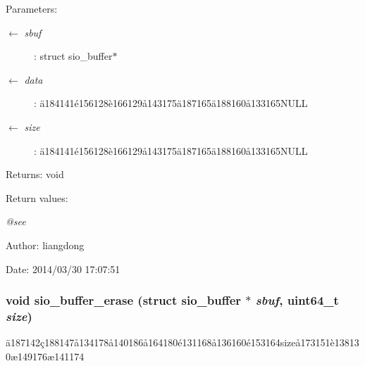 \begin{Desc}
\item[Parameters:]
\begin{description}
\item[\mbox{$\leftarrow$} {\em sbuf}]: struct sio\_\-buffer$\ast$ \item[\mbox{$\leftarrow$} {\em data}]: \"{a}184141\'{e}156128\`{e}166129\aa{}143175\"{a}187165\"{a}188160\aa{}133165NULL \item[\mbox{$\leftarrow$} {\em size}]: \"{a}184141\'{e}156128\`{e}166129\aa{}143175\"{a}187165\"{a}188160\aa{}133165NULL \end{description}
\end{Desc}
\begin{Desc}
\item[Returns:]void \end{Desc}
\begin{Desc}
\item[Return values:]
\begin{description}
\item[{\em @see}]\end{description}
\end{Desc}
\begin{Desc}
\item[Author:]liangdong \end{Desc}
\begin{Desc}
\item[Date:]2014/03/30 17:07:51 \end{Desc}
\subsubsection{\setlength{\rightskip}{0pt plus 5cm}void sio\_\-buffer\_\-erase (struct sio\_\-buffer $\ast$ {\em sbuf}, uint64\_\-t {\em size})}\label{sio__buffer_8c_a7}


\"{a}187142\c{c}188147\aa{}134178\aa{}140186\aa{}164180\'{e}131168\aa{}136160\'{e}153164size\aa{}173151\`{e}138130\ae{}149176\ae{}141174 

